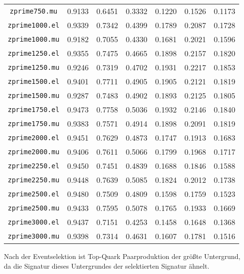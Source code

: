 \begin{table}
{\begin{tabular}{c|cccccc}
    \texttt{zprime750.mu}  & 0.9133 & 0.6451  & 0.3332  & 0.1220  & 0.1526  & 0.1173 \\
    \texttt{zprime1000.el} & 0.9339 & 0.7342  & 0.4399  & 0.1789  & 0.2087  & 0.1728 \\
    \texttt{zprime1000.mu} & 0.9182 & 0.7055  & 0.4330  & 0.1681  & 0.2021  & 0.1596 \\
    \texttt{zprime1250.el} & 0.9355 & 0.7475  & 0.4665  & 0.1898  & 0.2157 & 0.1820 \\
    \texttt{zprime1250.mu} & 0.9246 & 0.7319  & 0.4702  & 0.1931  & 0.2217  & 0.1853 \\
    \texttt{zprime1500.el} & 0.9401 & 0.7711  & 0.4905  & 0.1905  & 0.2121  & 0.1819 \\
    \texttt{zprime1500.mu} & 0.9287 & 0.7483  & 0.4902  & 0.1893  & 0.2125  & 0.1805 \\
    \texttt{zprime1750.el} & 0.9473 & 0.7758  & 0.5036  & 0.1932  & 0.2146  & 0.1840 \\
    \texttt{zprime1750.mu} & 0.9383 & 0.7571  & 0.4914  & 0.1898  & 0.2091  & 0.1819 \\
    \texttt{zprime2000.el} & 0.9451 & 0.7629  & 0.4873  & 0.1747  & 0.1913  & 0.1683 \\
    \texttt{zprime2000.mu} & 0.9406 & 0.7611  & 0.5066  & 0.1799  & 0.1968  & 0.1717 \\
    \texttt{zprime2250.el} & 0.9450 & 0.7451  & 0.4839  & 0.1688  & 0.1846  & 0.1588 \\
    \texttt{zprime2250.mu} & 0.9448 & 0.7639  & 0.5085  & 0.1824  & 0.2012  & 0.1738 \\
    \texttt{zprime2500.el} & 0.9480 & 0.7509  & 0.4809  & 0.1598  & 0.1759  & 0.1523 \\
    \texttt{zprime2500.mu} & 0.9433 & 0.7595  & 0.5078  & 0.1765  & 0.1933  & 0.1669 \\
    \texttt{zprime3000.el} & 0.9437 & 0.7151  & 0.4253  & 0.1458  & 0.1648  & 0.1368 \\
    \texttt{zprime3000.mu} & 0.9398 & 0.7314  & 0.4631  & 0.1607  & 0.1781  & 0.1516 \\
    \bottomrule 
    \end{tabular}}
\end{table}

Nach der Eventselektion ist Top-Quark Paarproduktion der größte Untergrund, da die Signatur dieses 
Untergrundes der selektierten Signatur ähnelt.